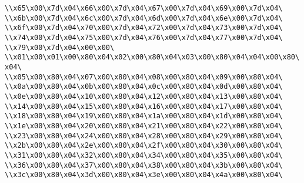 \verb|\\x65\x00\x7d\x04\x66\x00\x7d\x04\x67\x00\x7d\x04\x69\x00\x7d\x04\|\newline
\verb|\\x6b\x00\x7d\x04\x6c\x00\x7d\x04\x6d\x00\x7d\x04\x6e\x00\x7d\x04\|\newline
\verb|\\x6f\x00\x7d\x04\x70\x00\x7d\x04\x72\x00\x7d\x04\x73\x00\x7d\x04\|\newline
\verb|\\x74\x00\x7d\x04\x75\x00\x7d\x04\x76\x00\x7d\x04\x77\x00\x7d\x04\|\newline
\verb|\\x79\x00\x7d\x04\x00\x00\|\newline
\verb|\\x01\x00\x01\x00\x80\x04\x02\x00\x80\x04\x03\x00\x80\x04\x04\x00\x80\x04\|\newline
\verb|\\x05\x00\x80\x04\x07\x00\x80\x04\x08\x00\x80\x04\x09\x00\x80\x04\|\newline
\verb|\\x0a\x00\x80\x04\x0b\x00\x80\x04\x0c\x00\x80\x04\x0d\x00\x80\x04\|\newline
\verb|\\x0e\x00\x80\x04\x10\x00\x80\x04\x12\x00\x80\x04\x13\x00\x80\x04\|\newline
\verb|\\x14\x00\x80\x04\x15\x00\x80\x04\x16\x00\x80\x04\x17\x00\x80\x04\|\newline
\verb|\\x18\x00\x80\x04\x19\x00\x80\x04\x1a\x00\x80\x04\x1d\x00\x80\x04\|\newline
\verb|\\x1e\x00\x80\x04\x20\x00\x80\x04\x21\x00\x80\x04\x22\x00\x80\x04\|\newline
\verb|\\x23\x00\x80\x04\x24\x00\x80\x04\x28\x00\x80\x04\x29\x00\x80\x04\|\newline
\verb|\\x2b\x00\x80\x04\x2e\x00\x80\x04\x2f\x00\x80\x04\x30\x00\x80\x04\|\newline
\verb|\\x31\x00\x80\x04\x32\x00\x80\x04\x34\x00\x80\x04\x35\x00\x80\x04\|\newline
\verb|\\x36\x00\x80\x04\x37\x00\x80\x04\x38\x00\x80\x04\x3b\x00\x80\x04\|\newline
\verb|\\x3c\x00\x80\x04\x3d\x00\x80\x04\x3e\x00\x80\x04\x4a\x00\x80\x04\|\newline
